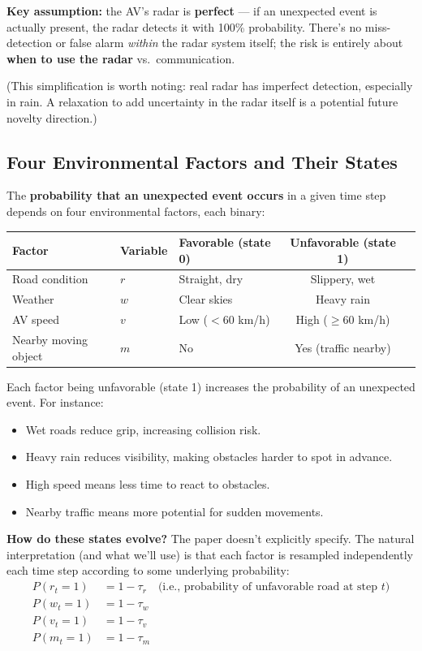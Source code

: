 \documentclass[12pt,a4paper]{article}
\begin{document}
\noindent\textbf{Key assumption:} the AV's radar is \textbf{perfect} --- if an unexpected event is actually present, the radar detects it with 100\% probability. There's no miss-detection or false alarm \textit{within} the radar system itself; the risk is entirely about \textbf{when to use the radar} vs.\ communication.

(This simplification is worth noting: real radar has imperfect detection, especially in rain. A relaxation to add uncertainty in the radar itself is a potential future novelty direction.)

\subsection{Four Environmental Factors and Their States}

The \textbf{probability that an unexpected event occurs} in a given time step depends on four environmental factors, each binary:

\begin{table}[h]
\centering
\begin{tabular}{lllcc}
\toprule
Factor & Variable & Favorable (state 0) & Unfavorable (state 1) \\
\midrule
Road condition & $r$ & Straight, dry & Slippery, wet \\
Weather & $w$ & Clear skies & Heavy rain \\
AV speed & $v$ & Low ($< 60$ km/h) & High ($\geq 60$ km/h) \\
Nearby moving object & $m$ & No & Yes (traffic nearby) \\
\bottomrule
\end{tabular}
\end{table}

Each factor being unfavorable (state 1) increases the probability of an unexpected event. For instance:
\begin{itemize}
    \item Wet roads reduce grip, increasing collision risk.
    \item Heavy rain reduces visibility, making obstacles harder to spot in advance.
    \item High speed means less time to react to obstacles.
    \item Nearby traffic means more potential for sudden movements.
\end{itemize}

\noindent\textbf{How do these states evolve?} The paper doesn't explicitly specify. The natural interpretation (and what we'll use) is that each factor is resampled independently each time step according to some underlying probability:
\begin{align}
    P(r_t = 1) &= 1 - \tau_r \quad \text{(i.e., probability of unfavorable road at step } t\text{)} \\
    P(w_t = 1) &= 1 - \tau_w \\
    P(v_t = 1) &= 1 - \tau_v \\
    P(m_t = 1) &= 1 - \tau_m
\end{align}
\end{document}
